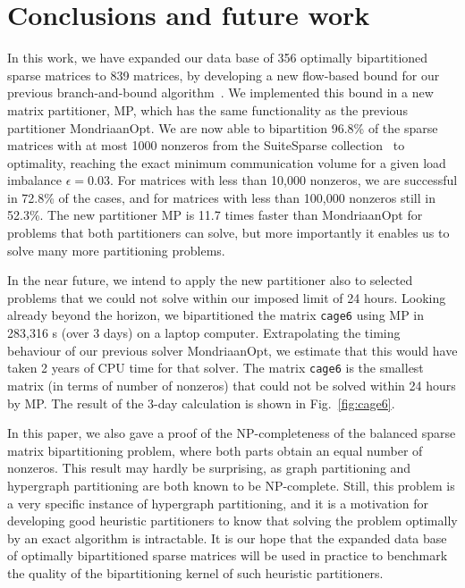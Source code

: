 \section{Conclusions and future work}
\label{sec:concl}
In this work, we have expanded our data base of 356 optimally bipartitioned sparse matrices
to 839 matrices, by developing a new flow-based bound for our previous branch-and-bound algorithm~\cite{pelt15}.
We implemented this bound in a new matrix partitioner, MP, which has the same functionality as the 
previous partitioner MondriaanOpt.
We are now able to bipartition 96.8\% of the sparse matrices with at most 1000 nonzeros
from the SuiteSparse collection~\cite{davis11}
to optimality, reaching the exact minimum communication volume for a given load imbalance $\epsilon=0.03$. 
For matrices with less than 10,000 nonzeros, we are successful in 72.8\% of the cases,
and for matrices with less than 100,000 nonzeros still in 52.3\%.    
The new partitioner MP is 11.7 times faster than MondriaanOpt for problems that both
partitioners can solve, but more importantly it enables us to solve many more partitioning problems.

In the near future, we intend to apply the new partitioner also to selected  problems that we could not solve
within our imposed limit of 24 hours. Looking already beyond the horizon,
we bipartitioned the matrix \texttt{cage6} using MP in 283,316 s (over 3 days) on a laptop computer.
Extrapolating the timing behaviour of our previous solver MondriaanOpt,
we estimate that this would have taken 2 years of CPU time for that solver.
The matrix \texttt{cage6} is the smallest matrix (in terms of number of nonzeros) that could not be solved within 24 hours
by MP.
The result of the 3-day calculation is shown in Fig.~\ref{fig:cage6}.

In this paper, we also gave a proof of the NP-completeness of the balanced sparse matrix bipartitioning problem,
where both parts obtain an equal number of nonzeros. This result may hardly be surprising,
as graph partitioning and hypergraph partitioning are both known to be NP-complete.
Still, this problem is a very specific instance of hypergraph partitioning,
and it is a motivation for developing good heuristic partitioners to know that solving the problem optimally
by an exact algorithm is intractable.
It is our hope that the expanded data base of optimally bipartitioned sparse matrices
will be used in practice to benchmark the quality of
the bipartitioning kernel of such heuristic partitioners.


